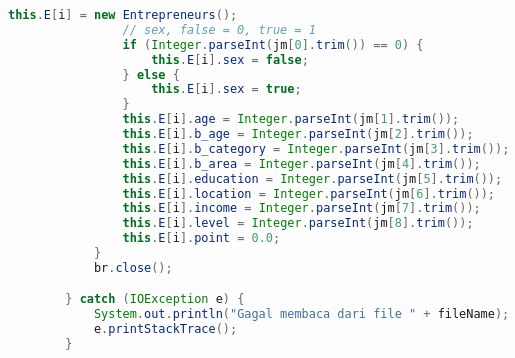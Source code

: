 \begin{lstlisting}[language=Java, caption=CA.java]
                this.E[i] = new Entrepreneurs();
                // sex, false = 0, true = 1
                if (Integer.parseInt(jm[0].trim()) == 0) {
                    this.E[i].sex = false;
                } else {
                    this.E[i].sex = true;
                }
                this.E[i].age = Integer.parseInt(jm[1].trim());
                this.E[i].b_age = Integer.parseInt(jm[2].trim());
                this.E[i].b_category = Integer.parseInt(jm[3].trim());
                this.E[i].b_area = Integer.parseInt(jm[4].trim());
                this.E[i].education = Integer.parseInt(jm[5].trim());
                this.E[i].location = Integer.parseInt(jm[6].trim());
                this.E[i].income = Integer.parseInt(jm[7].trim());
                this.E[i].level = Integer.parseInt(jm[8].trim());
                this.E[i].point = 0.0;
            }
            br.close();

        } catch (IOException e) {
            System.out.println("Gagal membaca dari file " + fileName);
            e.printStackTrace();
        }


\end{lstlisting}
